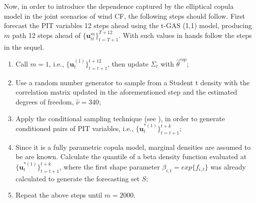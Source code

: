 \documentclass[a4paper]{IEEEtran}
\begin{document}
Now, in order to introduce the dependence captured by the elliptical copula model in the joint scenarios of wind CF, the following steps should follow. First forecast the PIT variables 12 steps ahead using the t-GAS (1,1) model, producing $m$ path 12 steps ahead of $\{\mathbf{u}^{m}_{it}\}_{t=T+1}^{T+12}$. With such values in hands follow the steps in the sequel.
   
\begin{enumerate}
\item Call $m=1$, i.e., $\{\mathbf{u}_{t}^{(1)}\}_{t=t+1}^{t+12}$, then update $\Sigma_{t}$ with $\hat{\theta}^{cop}$;

\item Use a random number generator to sample from a Student t density with the correlation matrix updated in the aforementioned step and the estimated degrees of freedom, $\hat{\nu}=340$;

\item Apply the conditional sampling technique (see \cite{cherubini2004copula}), in order to generate conditioned pairs of PIT variables, i.e., $\{\mathbf{u}_{t}^{*(1) }\}_{t=t+1}^{t+k}$;
 
\item Since it is a fully parametric copula model, marginal densities are assumed to be are known. Calculate the quantile of a beta density function evaluated at $\{\mathbf{u}_{t}^{*(1) }\}_{t=t+1}^{t+k}$, where the first shape parameter  $\beta_{i,t}=exp\{f_{i,t}\}$ was already calculated to generate the forecasting set $S$;

\item Repeat the above steps until $m=2000$.
\end{enumerate}
\end{document}
